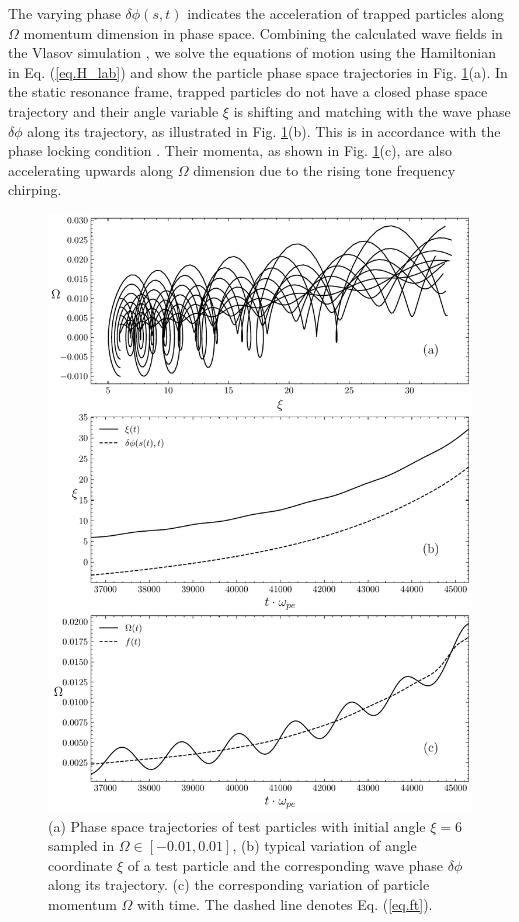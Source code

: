 
The varying phase $\delta \phi(s,t)$ indicates the acceleration of trapped particles along $\Omega$ momentum dimension in phase space.
Combining the calculated wave fields  in the Vlasov simulation \cite{zheng2024}, we solve the equations of motion using the Hamiltonian in Eq. (\ref{eq.H_lab}) and show the particle phase space trajectories in Fig. \ref{fig.phaseflow}(a). 
In the static resonance frame, trapped particles do not have a closed phase space trajectory and  their angle variable $\xi$  is shifting and matching with the wave phase $\delta \phi$ along its trajectory, as illustrated in Fig. \ref{fig.phaseflow}(b). This is in accordance with the phase locking condition \cite{tao_trap-release-amplify_2021}.
Their momenta, as shown in Fig. \ref{fig.phaseflow}(c), are also accelerating upwards along $\Omega$ dimension due to the rising tone frequency chirping.

\begin{figure}
    \centering
    \includegraphics[scale=0.5]{img/phaseflow.pdf}
    \caption{(a) Phase space trajectories of  test particles with initial angle $\xi = 6$ sampled in $\Omega \in [-0.01,0.01]$, (b) typical variation of angle coordinate $\xi$ of a test particle and the corresponding wave phase $\delta \phi$ along its trajectory. (c) the corresponding variation of particle momentum $\Omega$ with time. The dashed line denotes Eq. (\ref{eq.ft}).
    \label{fig.phaseflow}
    }
\end{figure}

